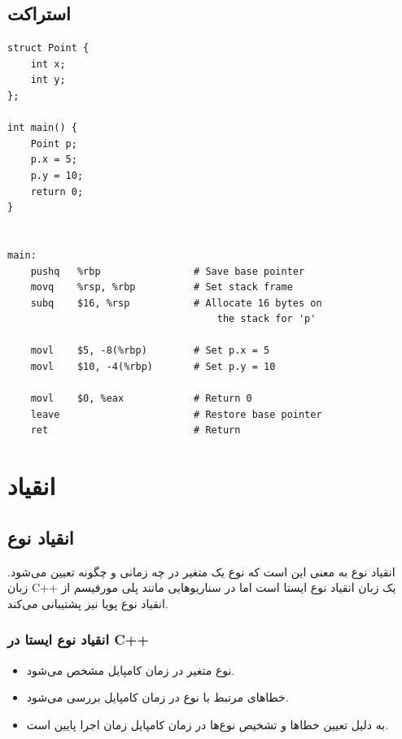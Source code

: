 \documentclass{article}
\begin{document}
\subsection*{استراکت}
\begin{LTR} %
\begin{lstlisting}
struct Point {
    int x;
    int y;
};

int main() {
    Point p;
    p.x = 5;
    p.y = 10;
    return 0;
}


main:
    pushq   %rbp                # Save base pointer
    movq    %rsp, %rbp          # Set stack frame
    subq    $16, %rsp           # Allocate 16 bytes on 
    								the stack for 'p'

    movl    $5, -8(%rbp)        # Set p.x = 5
    movl    $10, -4(%rbp)       # Set p.y = 10

    movl    $0, %eax            # Return 0
    leave                       # Restore base pointer
    ret                         # Return
\end{lstlisting}
\end{LTR}


\section*{انقیاد}

\subsection*{انقیاد نوع}
انقیاد نوع به معنی این است که نوع یک متغیر در چه زمانی و چگونه تعیین می‌‌شود. زبان C++ یک زبان انقیاد نوع ایستا است اما در سناریو‌هایی مانند پلی مورفیسم از انقیاد نوع پویا نیز پشتیبانی می‌کند.

\subsubsection*{انقیاد نوع ایستا در C++}
\begin{itemize}
    \item نوع متغیر در زمان کامپایل مشخص می‌شود.
    \item خطاهای مرتبط با نوع در زمان کامپایل بررسی می‌شود.
    \item به دلیل تعیین خطاها و تشخیص نوع‌ها در زمان کامپایل زمان اجرا پایین است.
\end{itemize}
\end{document}
